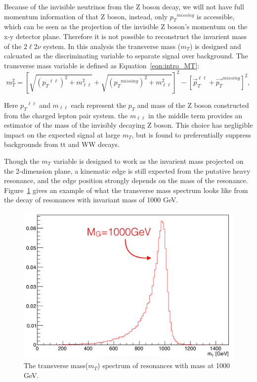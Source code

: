 \vspace{0.3cm}
Because of the invisible neutrinos from the Z boson decay, we will not have full momentum information of that Z boson, instead, only ${p_{T}}^{missing}$ is accessible, which can be seen as the projection of the invisible Z boson's momentum on the x-y detector plane. Therefore it is not possible to reconstruct the invarient mass of the $2\ell 2\nu$ system. In this analysis the transverse mass ($m_{T}$) is designed and calcuated as the discriminating variable to separate signal over background. The transverse mass variable is defined as Equation~\ref{eqn:intro_MT}:
\begin{equation}
m_{T}^2 = \left[ \sqrt{({p_{T}}^{\ell\ell})^2 + m^2_{\ell\ell}}
      + \sqrt{({p_{T}}^{missing})^2+m^2_{\ell\ell}}\right]^2
      - \left[\vec{p}_{T}^{\ell\ell}+\vec{p_{T}}^{missing}\right]^2,
\label{eqn:intro_MT}
\end{equation}

Here ${p_{T}}^{\ell\ell}$ and $m_{\ell\ell}$ each represent the $p_{T}$ and mass of the Z boson constructed from the charged lepton pair system. the $m_{\ell\ell}$ in the middle term provides an estimator of the mass of the invisibly decaying Z boson. This choice has negligible impact on the expected signal at large $m_{T}$, but is found to preferentially suppress backgrounds from tt and WW decays.

\vspace{0.3cm}
Though the $m_{T}$ variable is designed to work as the invarient mass projected on the 2-dimension plane, a kinematic edge is still expected from the putative heavy resonance, and the edge position strongly depends on the mass of the resonance. Figure~\ref{fig:intro_mt} gives an example of what the transverse mass spectrum looks like from the decay of resonances with invariant mass of 1000 GeV.

\begin{figure}[htbp]
\begin{center}
\includegraphics[width=0.72\linewidth]{figures/intro_example_mt.png}
\caption{The transverse mass($m_{T}$) spectrum of resonances with mass at 1000 GeV.}
\label{fig:intro_mt}
\end{center}
\end{figure}


